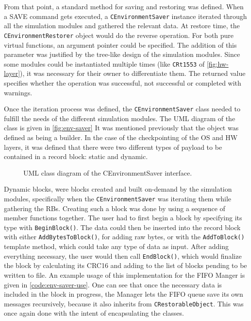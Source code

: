 {From that point, a standard method for saving and restoring was defined. When a SAVE command gets executed, a \texttt{CEnvironmentSaver} instance iterated through all the simulation modules and gathered the relevant data. At restore time, the \texttt{CEnvironmentRestorer} object would do the reverse operation. For both pure virtual functions, an argument pointer could be specified. The addition of this parameter was justified by the tree-like design of the simulation modules. Since some modules could be instantiated multiple times (like \texttt{CRt1553} of \autoref{fig:hw-layer}), it was necessary for their owner to differentiate them. The returned value specifies whether the operation was successful, not successful or completed with warnings. 

Once the iteration process was defined, the \texttt{CEnvironmentSaver} class needed to fulfill the needs of the different simulation modules. The UML diagram of the class is given in \autoref{fig:env-saver} It was mentioned previously that the object was defined as being a builder. In the case of the checkpointing of the OS and HW layers, it was defined that there were two different types of payload to be contained in a record block: static and dynamic. 

\begin{figure}[htbp]
	\centering
	\vspace{12pt}
	\footnotesize
	
	\caption{UML class diagram of the CEnvironmentSaver interface.}
	\label{fig:env-saver}
\end{figure}


Dynamic blocks, were blocks created and built on-demand by the simulation modules, specifically when the \texttt{CEnvironmentSaver} was iterating them while gathering the RBs. Creating such a block was done by using a sequence of member functions together. The user had to first begin a block by specifying its type with \texttt{BeginBlock()}. The data could then be inserted into the record block with either \texttt{AddBytesToBlock()}, for adding raw bytes, or with the \texttt{AddToBlock()} template method, which could take any type of data as input. After adding everything necessary, the user would then call \texttt{EndBlock()}, which would finalize the block by calculating its CRC16 and adding to the list of blocks pending to be written to file. An example usage of this implementation for the FIFO Manger is given in \autoref{code:env-saver-use}. One can see that once the necessary data is included in the block in progress, the Manager lets the FIFO queue save its own messages recursively, because it also inherits from \texttt{CRestorableObject}. This was once again done with the intent of encapsulating the classes.

}
